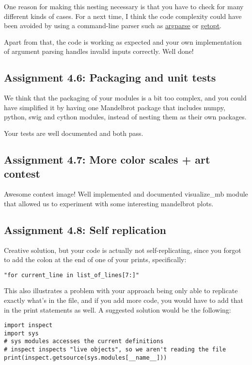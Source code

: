 \documentclass[a4paper]{article}
\begin{document}
One reason for making this nesting necessary is that you have to check for many different kinds of cases. For a next time, I think the code complexity could have been avoided by using a command-line parser such as \href{https://docs.python.org/3/library/argparse.html}{\underline{argparse}} or \href{https://docs.python.org/2/library/getopt.html}{\underline{getopt}}.

Apart from that, the code is working as expected and your own implementation of argument parsing handles invalid inputs correctly. Well done!

\subsection*{Assignment 4.6:  Packaging and unit tests}
We think that the packaging of your modules is a bit too complex, and you could have simplified it by having one Mandelbrot package that includes numpy, python, swig and cython modules, instead of nesting them as their own packages.

Your tests are well documented and both pass.

\subsection*{Assignment 4.7: More color scales + art contest}
Awesome contest image! Well implemented and documented visualize\_mb module that allowed us to experiment with some interesting mandelbrot plots.

\subsection*{Assignment 4.8: Self replication}
Creative solution, but your code is actually not self-replicating, since you forgot to add the colon at the end of one of your prints, specifically:

\begin{verbatim}
"for current_line in list_of_lines[7:]"
\end{verbatim}

This also illustrates a problem with your approach being only able to replicate exactly what's in the file, and if you add more code, you would have to add that in the print statements as well. A suggested solution would be the following:

\begin{verbatim}
import inspect
import sys
# sys modules accesses the current definitions
# inspect inspects "live objects", so we aren't reading the file
print(inspect.getsource(sys.modules[__name__]))
\end{verbatim}



\end{document}
